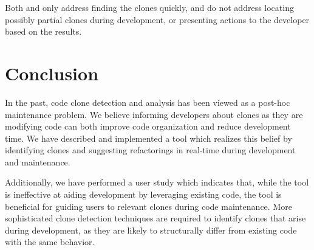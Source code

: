 \documentclass[nocopyrightspace,10pt]{sigplanconf}
\begin{document}
Both \cite{Keivanloo2011} and \cite{Lee2010} only address finding the
clones quickly, and do not address locating possibly partial clones
during development, or presenting actions to the developer based on
the results.

\section{Conclusion}
\label{sec:conclusion}

In the past, code clone detection and analysis has been viewed as a
post-hoc maintenance problem.
We believe informing developers about clones as they are modifying
code can both improve code organization and reduce development time.
We have described and implemented a tool which realizes this belief by
identifying clones and suggesting refactorings in real-time during
development and maintenance.

Additionally, we have performed a user study which indicates that,
while the tool is ineffective at aiding development by leveraging
existing code, the tool is beneficial for guiding users to relevant
clones during code maintenance. More sophisticated clone detection
techniques are required to identify clones that arise during
development, as they are likely to structurally differ from existing
code with the same behavior.

%

%
%
\end{document}
